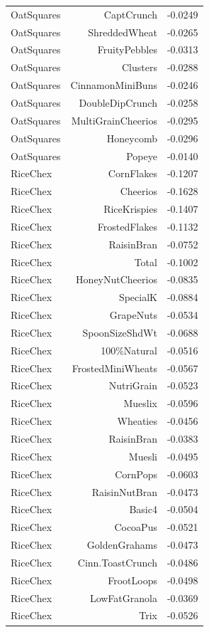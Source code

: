 \begin{longtable}{@{}lrr@{}}
OatSquares & CaptCrunch & -0.0249 \\
OatSquares & ShreddedWheat & -0.0265 \\
OatSquares & FruityPebbles & -0.0313 \\
OatSquares & Clusters & -0.0288 \\
OatSquares & CinnamonMiniBuns & -0.0246 \\
OatSquares & DoubleDipCrunch & -0.0258 \\
OatSquares & MultiGrainCheerios & -0.0295 \\
OatSquares & Honeycomb & -0.0296 \\
OatSquares & Popeye & -0.0140 \\
RiceChex & CornFlakes & -0.1207 \\
RiceChex & Cheerios & -0.1628 \\
RiceChex & RiceKrispies & -0.1407 \\
RiceChex & FrostedFlakes & -0.1132 \\
RiceChex & RaisinBran & -0.0752 \\
RiceChex & Total & -0.1002 \\
RiceChex & HoneyNutCheerios & -0.0835 \\
RiceChex & SpecialK & -0.0884 \\
RiceChex & GrapeNuts & -0.0534 \\
RiceChex & SpoonSizeShdWt & -0.0688 \\
RiceChex & 100\%Natural & -0.0516 \\
RiceChex & FrostedMiniWheats & -0.0567 \\
RiceChex & NutriGrain & -0.0523 \\
RiceChex & Mueslix & -0.0596 \\
RiceChex & Wheaties & -0.0456 \\
RiceChex & RaisinBran & -0.0383 \\
RiceChex & Muesli & -0.0495 \\
RiceChex & CornPops & -0.0603 \\
RiceChex & RaisinNutBran & -0.0473 \\
RiceChex & Basic4 & -0.0504 \\
RiceChex & CocoaPus & -0.0521 \\
RiceChex & GoldenGrahams & -0.0473 \\
RiceChex & Cinn.ToastCrunch & -0.0486 \\
RiceChex & FrootLoops & -0.0498 \\
RiceChex & LowFatGranola & -0.0369 \\
RiceChex & Trix & -0.0526 \\

\end{longtable}
